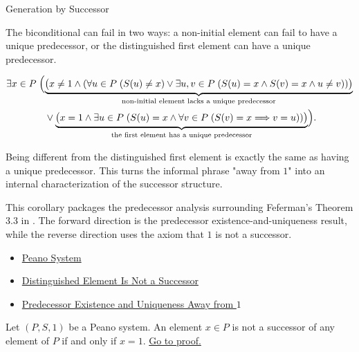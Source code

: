 \begin{topicbox}{Generation by Successor}
\begin{remark*}
The biconditional can fail in two ways: a non-initial element can fail to have
a unique predecessor, or the distinguished first element can have a unique
predecessor.
\end{remark*}

\begin{remark*}
\[
\begin{aligned}
&\exists x \in P\;\Bigl(
\underbrace{\bigl(x\neq 1 \land
(\forall u \in P\;(S(u)\neq x)
\lor
\exists u,v \in P\;(S(u)=x \land S(v)=x \land u\neq v))\bigr)}_
{\text{non-initial element lacks a unique predecessor}}\\
&\qquad\qquad\lor
\underbrace{\bigl(x=1 \land \exists u \in P\;(S(u)=x \land
\forall v \in P\;(S(v)=x \Longrightarrow v=u))\bigr)}_
{\text{the first element has a unique predecessor}}
\Bigr).
\end{aligned}
\]
\end{remark*}

\begin{remark*}[Interpretation]
Being different from the distinguished first element is exactly the same as
having a unique predecessor. This turns the informal phrase "away from $1$"
into an internal characterization of the successor structure.
\end{remark*}

\begin{remark*}
This corollary packages the predecessor analysis surrounding Feferman's
Theorem 3.3 in \citet{FefermanNumberSystems1964}. The forward direction is
the predecessor existence-and-uniqueness result, while the reverse direction
uses the axiom that $1$ is not a successor.
\end{remark*}

\begin{dependencies}
\begin{itemize}
  \item \hyperref[def:peano-system]{Peano System}
  \item \hyperref[ax:peano-one-not-successor]{Distinguished Element Is Not a Successor}
  \item \hyperref[cor:predecessor-exists-unique-away-from-one]{Predecessor Existence and Uniqueness Away from $1$}
\end{itemize}
\end{dependencies}

\begin{tcolorbox}[colback=corbox, colframe=corborder, arc=2pt,
  left=6pt, right=6pt, top=4pt, bottom=4pt,
  title={\small\textbf{Corollary (The Distinguished Element Is the Unique Non-Successor)}} ,
  fonttitle=\small\bfseries]
\begin{corollary}
\label{cor:one-is-unique-non-successor}
Let $(P,S,1)$ be a Peano system. An element $x \in P$ is not a successor of
any element of $P$ if and only if $x=1$.
\hyperref[prf:one-is-unique-non-successor]{Go to proof.}
\end{corollary}
\end{tcolorbox}


\end{topicbox}
